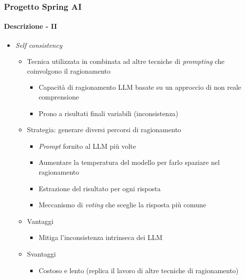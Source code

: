 %
\begin{frame}[t,fragile] \frametitle{Progetto Spring AI}
    \framesubtitle{Descrizione - II}
    {\small
        \begin{itemize}[leftmargin=10pt,align=right]
            \item[\alertedcircled{1}] \textit{Self consistency}
            \begin{itemize}[leftmargin=10pt,align=right]
                \item[\alert{\faArrowCircleRight}] Tecnica utilizzata in combinata ad altre tecniche di \textit{prompting} che coinvolgono il \alert{ragionamento}
                \begin{itemize}[leftmargin=10pt,align=right]
                    \item[\alert{\faArrowCircleRight}] Capacità di ragionamento LLM basate su un approccio di \alert{non reale comprensione}
                    \item[\alert{\faArrowCircleRight}] Prono a risultati finali variabili (\alert{inconsistenza})
                \end{itemize}
                \item[\alert{\faArrowCircleRight}] Strategia: generare diversi \alert{percorsi di ragionamento}
                \begin{itemize}[leftmargin=10pt,align=right]
                    \item[\alert{\faArrowCircleRight}] \textit{Prompt} fornito al LLM più volte
                    \item[\alert{\faExclamationTriangle}] Aumentare la temperatura del modello per farlo spaziare nel ragionamento 
                    \item[\alert{\faArrowCircleRight}] Estrazione del risultato per ogni risposta
                    \item[\alert{}] Meccanismo di \textit{voting} che sceglie la risposta più comune 
                \end{itemize}
                \item[\alert{\faArrowCircleRight}] Vantaggi
                \begin{itemize}[leftmargin=10pt,align=right]
                    \item[\alert{\faArrowCircleRight}] Mitiga l'inconsistenza intrinseca dei LLM
                \end{itemize}
                \item[\alert{\faArrowCircleRight}] Svantaggi
                \begin{itemize}[leftmargin=10pt,align=right]
                    \item[\alert{\faArrowCircleRight}] Costoso e lento (replica il lavoro di altre tecniche di ragionamento)
                \end{itemize}               
            \end{itemize}
        \end{itemize}
    }
\end{frame}
